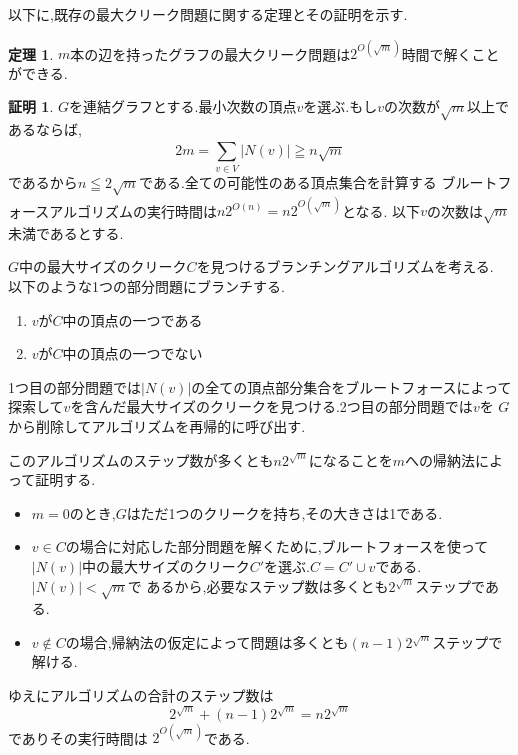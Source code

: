 \documentclass{thesis}
\theoremstyle{definition}
\newtheorem{theorem}{定理}[chapter]
\newtheorem*{prf*}{証明}
\begin{document}
以下に,既存の最大クリーク問題に関する定理とその証明を示す.
\begin{theorem} \label{theorem:1}
$m$本の辺を持ったグラフの最大クリーク問題は$2^{O(\sqrt{m})}$時間で解くことができる.
\begin{prf*}
$G$を連結グラフとする.最小次数の頂点$v$を選ぶ.もし$v$の次数が$\sqrt{m}$以上であるならば,
\[ 2m = \sum_{v \in V}^{} |N(v)| \geqq n\sqrt{m} \]
であるから$n \leqq 2\sqrt{m}$である.全ての可能性のある頂点集合を計算する
ブルートフォースアルゴリズムの実行時間は$n2^{O(n)} = n2^{O(\sqrt{m})}$となる.
以下$v$の次数は$\sqrt{m}$未満であるとする.

$G$中の最大サイズのクリーク$C$を見つけるブランチングアルゴリズムを考える.
以下のような1つの部分問題にブランチする.
\begin{enumerate}
 \item $v$が$C$中の頂点の一つである
 \item $v$が$C$中の頂点の一つでない
\end{enumerate}
1つ目の部分問題では$|N(v)|$の全ての頂点部分集合をブルートフォースによって
探索して$v$を含んだ最大サイズのクリークを見つける.2つ目の部分問題では$v$を
$G$から削除してアルゴリズムを再帰的に呼び出す.

このアルゴリズムのステップ数が多くとも$n2^{\sqrt{m}}$になることを$m$への帰納法によって証明する.
\begin{itemize}
 \item $m = 0$のとき,$G$はただ1つのクリークを持ち,その大きさは1である.	
 \item $v \in C$の場合に対応した部分問題を解くために,ブルートフォースを使って
$|N(v)|$中の最大サイズのクリーク$C'$を選ぶ.$C = C'  \cup  v$である.$|N(v)| < \sqrt{m}$で
あるから,必要なステップ数は多くとも$2^{\sqrt{m}}$ステップである.
 \item $v \notin C$の場合,帰納法の仮定によって問題は多くとも$(n - 1)2^{\sqrt{m}}$ステップで解ける.
\end{itemize}
ゆえにアルゴリズムの合計のステップ数は
\[  2^{\sqrt{m}} +  (n - 1)2^{\sqrt{m}} = n2^{\sqrt{m}} \]
でありその実行時間は $2^{O(\sqrt{m})}$である.
\end{prf*}
\end{theorem}
\end{document}
